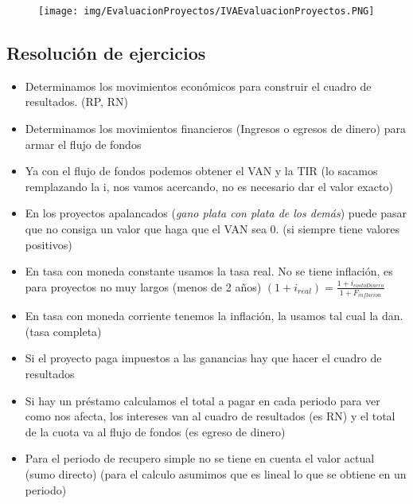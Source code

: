 \documentclass[titlepage,a4paper]{article}
\begin{document}
\begin{figure}[!htb]
    \centering
    \texttt{[image: img/EvaluacionProyectos/IVAEvaluacionProyectos.PNG]}
\end{figure}

\newpage
\subsection{Resolución de ejercicios}
\begin{itemize}
    \item Determinamos los movimientos económicos para construir el cuadro de resultados. (RP, RN)
    \item Determinamos los movimientos financieros (Ingresos o egresos de dinero) para armar el flujo de fondos
    \item Ya con el flujo de fondos podemos obtener el VAN y la TIR (lo sacamos remplazando la i, nos vamos acercando, no es necesario dar el valor exacto)
    \item En los proyectos apalancados (\textit{gano plata con plata de los demás}) puede pasar que no consiga un valor que haga que el VAN sea 0. (si siempre tiene valores positivos)
    \item En tasa con moneda constante usamos la tasa real. No se tiene inflación, es para proyectos no muy largos (menos de 2 años) $ (1 + i_{real}) = \frac{1 + i_{costoDinero}}{1 + F_{inflacion}}  $
    \item En tasa con moneda corriente tenemos la inflación, la usamos tal cual la dan. (tasa completa)
    \item Si el proyecto paga impuestos a las ganancias hay que hacer el cuadro de resultados
    \item Si hay un préstamo calculamos el total a pagar en cada periodo para ver como nos afecta, los intereses van al cuadro de resultados (es RN) y el total de la cuota va al flujo de fondos (es egreso de dinero)
    \item Para el periodo de recupero simple no se tiene en cuenta el valor actual (sumo directo) (para el calculo asumimos que es lineal lo que se obtiene en un periodo)
\end{itemize}


\end{document}
